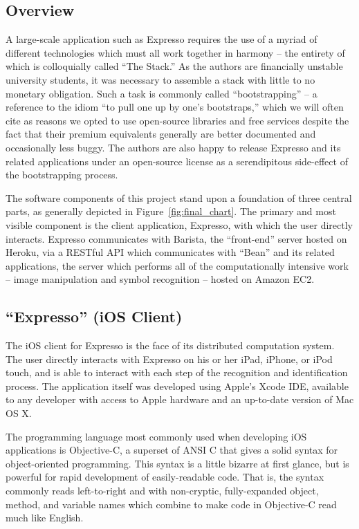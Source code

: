 \documentclass{acm_proc_article-sp}
\begin{document}
\subsection{Overview}
A large-scale application such as Expresso requires the use of a myriad of different technologies which must all work together in harmony --
the entirety of which is colloquially called ``The Stack.'' As the authors are financially unstable university students, it was necessary to
assemble a stack with little to no monetary obligation. Such a task is commonly called ``bootstrapping'' -- a reference to the idiom ``to pull one up by one's bootstraps,'' which we will often cite as reasons we opted to use open-source libraries and free services despite the fact that their premium equivalents generally are better documented and occasionally less buggy. The authors are also happy to release Expresso and its related applications under an open-source license as a serendipitous side-effect of the bootstrapping process.

The software components of this project stand upon a foundation of three central parts, as generally depicted in Figure~\ref{fig:final_chart}. The primary and most visible component is the client application, Expresso, with which the user directly interacts. Expresso communicates with Barista, the ``front-end'' server hosted on Heroku, via a RESTful API which communicates with ``Bean'' and its related applications, the server which performs all of the computationally intensive work -- image manipulation and symbol recognition -- hosted on Amazon EC2.

\subsection{``Expresso'' (iOS Client)}
The iOS client for Expresso is the face of its distributed computation system. The user directly interacts with Expresso on his or her iPad, iPhone, or iPod touch, and is able to interact with each step of the recognition and identification process. The application itself was developed using Apple's Xcode IDE, available to any developer with access to Apple hardware and an up-to-date version of Mac OS X.

The programming language most commonly used when developing iOS applications is Objective-C, a superset of ANSI C that gives a solid syntax for object-oriented programming. This syntax is a little bizarre at first glance, but is powerful for rapid development of easily-readable code. That is, the syntax commonly reads left-to-right and with non-cryptic, fully-expanded object, method, and variable names which combine to make code in Objective-C read much like English.
\end{document}
